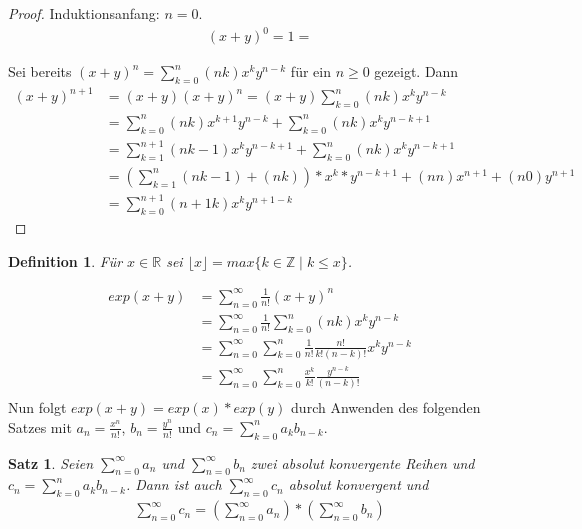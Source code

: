 \documentclass[a4paper,10pt]{article}
\newtheorem{definition}{Definition}
\newtheorem{satz}{Satz}
\begin{document}
\begin{proof}
 Induktionsanfang: $n = 0$.
 \begin{align*}
  (x + y)^0 = 1 =
 \end{align*}

 Sei bereits $(x + y)^n = \sum_{k = 0}^n (n k) x^k y^{n - k}$ für ein $n \ge 0$ gezeigt.
 Dann
 \begin{align*}
  (x + y)^{n + 1} & = (x + y)(x + y)^n = (x + y) \sum_{k = 0}^n (n k) x^k y^{n - k}\\
  & = \sum_{k = 0}^n (n k) x^{k + 1} y^{n - k} + \sum_{k = 0}^n (n k) x^k y^{n - k + 1}\\
  & = \sum_{k = 1}^{n + 1} (n k-1) x^k y^{n - k + 1} + \sum_{k = 0}^n (n k) x^k y^{n - k + 1}\\
  & = (\sum_{k = 1}^n (n k-1) + (n k)) * x^k * y^{n - k + 1} + (n n) x^{n + 1} + (n 0) y^{n + 1}\\
  & = \sum_{k = 0}^{n + 1} (n+1 k) x^k y^{n + 1 - k}
 \end{align*}
\end{proof}

\begin{definition}
 Für $x \in \mathbb{R}$ sei $\lfloor x \rfloor = max \{k \in \mathbb{Z} \mid k \le x\}$.
\end{definition}

\begin{align*}
 exp(x + y) & = \sum_{n = 0}^\infty \frac{1}{n!} (x + y)^n\\
 & = \sum_{n = 0}^\infty \frac{1}{n!} \sum_{k = 0}^n (n k) x^k y^{n - k}\\
 & = \sum_{n = 0}^\infty \sum_{k = 0}^n \frac{1}{n!} \frac{n!}{k!(n - k)!} x^k y^{n - k}\\
 & = \sum_{n = 0}^\infty \sum_{k = 0}^n \frac{x^k}{k!} \frac{y^{n -k}}{(n - k)!}\\
\end{align*}
Nun folgt $exp(x + y) = exp(x) * exp(y)$ durch Anwenden des folgenden Satzes mit $a_n = \frac{x^n}{n!}$, $b_n = \frac{y^n}{n!}$ und $c_n = \sum_{k = 0}^n a_kb_{n - k}$.

\begin{satz}
 Seien $\sum_{n = 0}^\infty a_n$ und $\sum_{n = 0}^\infty b_n$ zwei absolut konvergente Reihen und $c_n = \sum_{k = 0}^n a_kb_{n - k}$.
 Dann ist auch $\sum_{n = 0}^\infty c_n$ absolut konvergent und
 \begin{align*}
  \sum_{n = 0}^\infty c_n = (\sum_{n = 0}^\infty a_n) * (\sum_{n = 0}^\infty b_n)
 \end{align*}
\end{satz}
\end{document}
